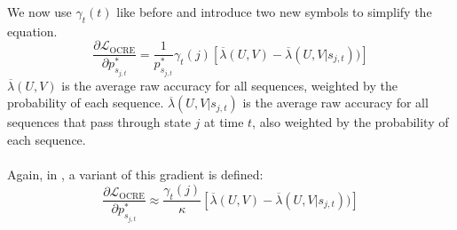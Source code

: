 We now use $\gamma_t(t)$ like before and introduce two new symbols to simplify the equation.
\[
\frac{\partial\mathcal{L}_{\text{OCRE}}}{\partial p^*_{s_{j,t}}} = \frac{1}{p^*_{s_{j,t}}} \gamma_t(j) \left[ \overline{\lambda}(U, V) - \overline{\lambda}(U, V|s_{j,t})) \right]
\]
$\overline{\lambda}(U, V)$ is the average raw accuracy for all sequences, weighted by the probability of each sequence. $\overline{\lambda}(U, V|s_{j,t})$ is the average raw accuracy for all sequences that pass through state $j$ at time $t$, also weighted by the probability of each sequence. \\ \\
Again, in \cite{ghoshal2013sequence}, a variant of this gradient is defined: 
\[
\frac{\partial\mathcal{L}_{\text{OCRE}}}{\partial p^*_{s_{j,t}}} \approx \frac{\gamma_t(j)}{\kappa} \left[ \overline{\lambda}(U, V) - \overline{\lambda}(U, V|s_{j,t})) \right]
\]
